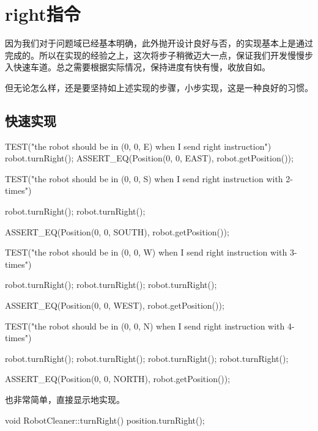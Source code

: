 \section{right指令}

\begin{content}

因为我们对于问题域已经基本明确，此外抛开设计良好与否，的实现基本上是通过完成的。所以在实现的经验之上，这次将步子稍微迈大一点，保证我们开发慢慢步入快速车道。总之需要根据实际情况，保持进度有快有慢，收放自如。

但无论怎么样，还是要坚持如上述实现的步骤，小步实现，这是一种良好的习惯。

\subsection{快速实现}

\begin{leftbar}
\begin{c++}[caption={test/robot-cleaner/TestRobotCleaner.h}]    
TEST("the robot should be in (0, 0, E) when I send right instruction")
{
    robot.turnRight();
    ASSERT_EQ(Position(0, 0, EAST), robot.getPosition());
}

TEST("the robot should be in (0, 0, S) when I send right instruction with 2-times")
{
    robot.turnRight();
    robot.turnRight();
    
    ASSERT_EQ(Position(0, 0, SOUTH), robot.getPosition());
}

TEST("the robot should be in (0, 0, W) when I send right instruction with 3-times")
{
    robot.turnRight();
    robot.turnRight();
    robot.turnRight();

    ASSERT_EQ(Position(0, 0, WEST), robot.getPosition());
}

TEST("the robot should be in (0, 0, N) when I send right instruction with 4-times")
{
    robot.turnRight();
    robot.turnRight();
    robot.turnRight();
    robot.turnRight();

    ASSERT_EQ(Position(0, 0, NORTH), robot.getPosition());
}
\end{c++}
\end{leftbar}

也非常简单，直接显示地实现。

\begin{leftbar}
\begin{c++}[caption={src/robot-cleaner/RobotCleaner.cpp}]
void RobotCleaner::turnRight()
{
    position.turnRight();
}
\end{c++}
\end{leftbar}


\end{content}

